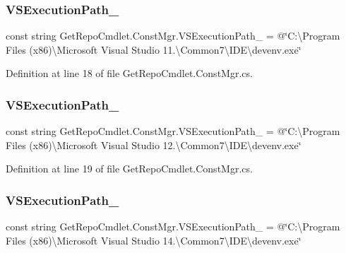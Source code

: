 \subsubsection{\texorpdfstring{V\+S\+Execution\+Path\+\_}{VSExecutionPath\_11}}
{\footnotesize\ttfamily const string Get\+Repo\+Cmdlet.\+Const\+Mgr.\+V\+S\+Execution\+Path\+\_ = @\char`\"{}C\+:\textbackslash{}\+Program Files (x86)\textbackslash{}Microsoft Visual Studio 11.\textbackslash{}Common7\textbackslash{}\+I\+D\+E\textbackslash{}devenv.\+exe\char`\"{}\hspace{0.3cm}{\ttfamily [package]}}



Definition at line 18 of file Get\+Repo\+Cmdlet.\+Const\+Mgr.\+cs.

\mbox{\label{class_get_repo_cmdlet_1_1_const_mgr_a18461eb6aee2c965490537d4163b90fe}} 
\subsubsection{\texorpdfstring{V\+S\+Execution\+Path\+\_}{VSExecutionPath\_12}}
{\footnotesize\ttfamily const string Get\+Repo\+Cmdlet.\+Const\+Mgr.\+V\+S\+Execution\+Path\+\_ = @\char`\"{}C\+:\textbackslash{}\+Program Files (x86)\textbackslash{}Microsoft Visual Studio 12.\textbackslash{}Common7\textbackslash{}\+I\+D\+E\textbackslash{}devenv.\+exe\char`\"{}\hspace{0.3cm}{\ttfamily [package]}}



Definition at line 19 of file Get\+Repo\+Cmdlet.\+Const\+Mgr.\+cs.

\mbox{\label{class_get_repo_cmdlet_1_1_const_mgr_a01df29a09d743d91af177b63d2fed473}} 
\subsubsection{\texorpdfstring{V\+S\+Execution\+Path\+\_}{VSExecutionPath\_14}}
{\footnotesize\ttfamily const string Get\+Repo\+Cmdlet.\+Const\+Mgr.\+V\+S\+Execution\+Path\+\_ = @\char`\"{}C\+:\textbackslash{}\+Program Files (x86)\textbackslash{}Microsoft Visual Studio 14.\textbackslash{}Common7\textbackslash{}\+I\+D\+E\textbackslash{}devenv.\+exe\char`\"{}\hspace{0.3cm}{\ttfamily [package]}}



